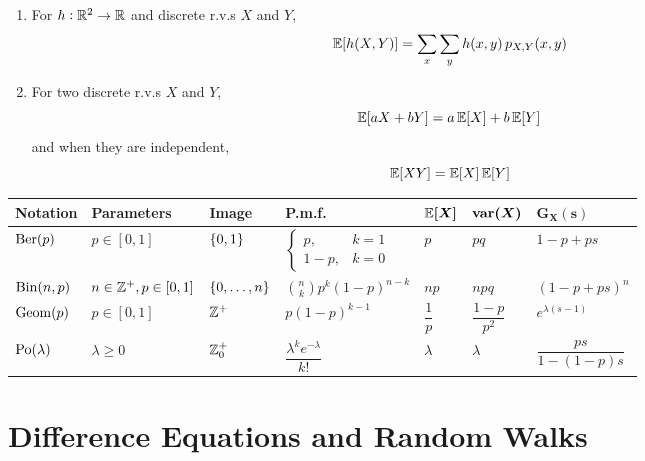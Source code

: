 \documentclass{styles/note}
\begin{document}
\begin{enumerate}[label=(\alph*)]
    \item For $h : \mathbb{R}^2 \to \mathbb{R}$ and discrete r.v.s $X$ and $Y$,
      \begin{equation}
        \operatorname{\mathbb{E}}[h(X, Y)] = \sum_x \sum_y h(x, y)\, p_{X, Y}(x, y)
      \end{equation}
    
    \item For two discrete r.v.s $X$ and $Y$,
      \begin{equation}
        \operatorname{\mathbb{E}}[aX + bY] = a\operatorname{\mathbb{E}}[X] + b\operatorname{\mathbb{E}}[Y]
      \end{equation}
      and when they are independent,
      \begin{equation}
        \operatorname{\mathbb{E}}[XY] = \operatorname{\mathbb{E}}[X] \operatorname{\mathbb{E}}[Y]
      \end{equation}
  \end{enumerate}
  
  \begin{center}
  \begin{table}[H]
  \begin{tabular}{lllllll}
    \textbf{Notation} & \textbf{Parameters} & \textbf{Image} & \textbf{P.m.f.} & $\boldsymbol{\operatorname{\mathbb{E}}[X]}$ & $\boldsymbol{\operatorname{var}(X)}$ & $\boldsymbol{G_X(s)}$ \\\hline
    $\operatorname{\mathrm{Ber}}(p)$ & $p \in [0, 1]$ & $\set{0, 1}$ & $\begin{cases} p, & k = 1 \\ 1 - p, & k = 0 \end{cases}$ & $p$ & $pq$ & $1 - p + ps$ \\
    $\operatorname{\mathrm{Bin}}(n, p)$ & $n \in \mathbb{Z}^+, p \in [0, 1]$ & $\set{0, \dots, n}$ & $\displaystyle {n \choose k} p^k (1 - p)^{n - k}$ & $np$ & $npq$ & $(1 - p + ps)^n$ \\
    $\operatorname{\mathrm{Geom}}(p)$ & $p \in [0, 1]$ & $\mathbb{Z}^+$ & $p (1 - p)^{k - 1}$ & $\dfrac{1}{p}$ & $\dfrac{1 - p}{p^2}$ & $e^{\lambda(s-1)}$ \\
    $\operatorname{\mathrm{Po}}(\lambda)$ & $\lambda \geqslant 0$ & $\mathbb{Z}^+_0$ & $\dfrac{\lambda^k e^{-\lambda}}{k!}$ & $\lambda$ & $\lambda$ & $\dfrac{ps}{1 - (1 - p)s}$
  \end{tabular}
  \end{table}
  \end{center}


\newpage
\section{Difference Equations and Random Walks}
\end{document}
